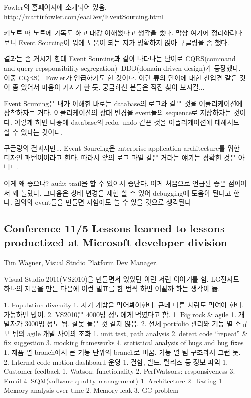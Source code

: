 \documentclass[a4paper]{article}
\begin{document}
Fowler의 홈페이지에 소개되어 있음.
http://martinfowler.com/eaaDev/EventSourcing.html
 
키노트 때 노트에 기록도 하고 대강 이해했다고 생각을 했다. 막상 여기에
정리하려다 보니 Event Sourcing이 뭐에 도움이 되는 지가 명확하지 않아
구글링을 좀 했다.
 
결과는 좀 거시기 한데 Event Sourcing과 같이 나타나는 단어로
CQRS(command and query repsponsibility segregation), DDD(domain-driven
design)가 등장했다. 이중 CQRS는 Fowler가 언급하기도 한 것이다. 이런
류의 단어에 대한 선입견 같은 것이 좀 있어서 마음이 거시기 한
듯. 궁금하신 분들은 직접 찾아 보시길...
 
Event Sourcing은 내가 이해한 바로는 database의 로그와 같은 것을
어플리케이션에 장착하자는 거다. 어플리케이션의 상태 변경을 event들의
sequence로 저장하자는 것이다. 이렇게 하면 나중에 database의 redo, undo
같은 것을 어플리케이션에 대해서도 할 수 있다는 것이다.
 
구글링의 결과지만... Event Sourcing은 enterprise application
architecture를 위한 디자인 패턴이이라고 한다. 따라서 앞의 로그 파일
같은 거라는 얘기는 정확한 것은 아니다.
 
이게 왜 좋으냐? audit trail을 할 수 있어서 좋단다. 이게 처음으로 언급된
좋은 점이어서 꽤 놀랐다. 그다음은 상태 변경을 재현 할 수 있어
debugging에 도움이 된다고 한다.  임의의 event들을 만들면 시험에도 쓸 수
있을 것으로 생각된다.

\subsection{Conference 11/5 Lessons learned to lessons productized at Microsoft developer division}
 
Tim Wagner, Visual Studio Platform Dev Manager.
 
Visual Studio 2010(VS2010)을 만들면서 있었던 이런 저런 이야기를
함. LG전자도 하나의 제품을 만든 다음에 이런 발표를 한 번씩 하면 어떨까
하는 생각이 듦.
 
1. Population diversity
1. 자기 개밥을 먹어봐야한다. 근데 다른 사람도 먹여야 한다. 가능하면 많이.
2. VS2010은 4000명 정도에게 먹였다고 함.
1. Big rock \& agile
1. 개발자가 3000명 정도 됨. 잘못 들은 것 같지 않음.
2. 전체 portfolio 관리와 기능 별 소규모 팀의 agile 개발 사이의 조화
1. unit test, path analysis
2. detect code “repeat” \& fix suggestion
3. mocking frameworks
4. statistical analysis of bugs and bug fixes
1. 제품 별 branch에서 큰 기능 단위의 branch로 바꿈.  기능 별 팀 구조라서 그런 듯.
2. Internal code motion dashboard 운영
1. 결함, 빌드, 릴리즈 등 정보 파악
1. Customer feedback
1. Watson: functionality
2. PerfWatsons: responsiveness
3. Email
4. SQM(software quality management)
1. Architecture
2. Testing
1. Memory analysis over time
2. Memory leak
3. GC problem
 
\end{document}
